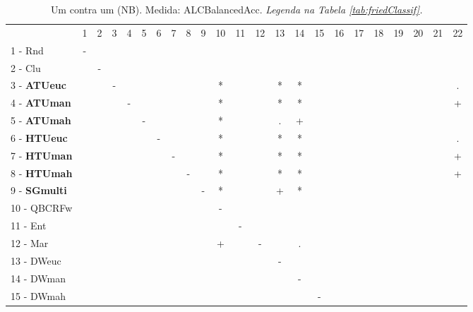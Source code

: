 \begin{table}[h]
\caption{Um contra um (NB). Medida: ALCBalancedAcc. \textit{Legenda na Tabela \ref{tab:friedClassif}.}}
\begin{center}\begin{tabular}{lcc|cc|cc|cc|cc|cc|cc|cc|cc|cc|cc}
 			& 1 & 2 & 3 & 4 & 5 & 6 & 7 & 8 & 9 & 10 & 11 & 12 & 13 & 14 & 15 & 16 & 17 & 18 & 19 & 20 & 21 & 22\\
1 - Rnd  	& - &   &   &   &   &   &   &   &   &   &   &   &   &   &   &   &   &   &   &   &   &   \\
2 - Clu  	&   & - &   &   &   &   &   &   &   &   &   &   &   &   &   &   &   &   &   &   &   &   \\ \hline
3 - \textbf{ATUeuc}	&   &   & - &   &   &   &   &   &   & * &   &   & * & * &   &   &   &   &   &   &   & . \\
4 - \textbf{ATUman}	&   &   &   & - &   &   &   &   &   & * &   &   & * & * &   &   &   &   &   &   &   & + \\ \hline
5 - \textbf{ATUmah}	&   &   &   &   & - &   &   &   &   & * &   &   & . & + &   &   &   &   &   &   &   &   \\
6 - \textbf{HTUeuc}	&   &   &   &   &   & - &   &   &   & * &   &   & * & * &   &   &   &   &   &   &   & . \\ \hline
7 - \textbf{HTUman}	&   &   &   &   &   &   & - &   &   & * &   &   & * & * &   &   &   &   &   &   &   & + \\
8 - \textbf{HTUmah}	&   &   &   &   &   &   &   & - &   & * &   &   & * & * &   &   &   &   &   &   &   & + \\ \hline
9 - \textbf{SGmulti}	&   &   &   &   &   &   &   &   & - & * &   &   & + & * &   &   &   &   &   &   &   &   \\
10 - QBCRFw	&   &   &   &   &   &   &   &   &   & - &   &   &   &   &   &   &   &   &   &   &   &   \\ \hline
11 - Ent  	&   &   &   &   &   &   &   &   &   &   & - &   &   &   &   &   &   &   &   &   &   &   \\
12 - Mar  	&   &   &   &   &   &   &   &   &   & + &   & - &   & . &   &   &   &   &   &   &   &   \\ \hline
13 - DWeuc	&   &   &   &   &   &   &   &   &   &   &   &   & - &   &   &   &   &   &   &   &   &   \\
14 - DWman	&   &   &   &   &   &   &   &   &   &   &   &   &   & - &   &   &   &   &   &   &   &   \\ \hline
15 - DWmah	&   &   &   &   &   &   &   &   &   &   &   &   &   &   & - &   &   &   &   &   &   &   \\

\end{tabular}
\end{center}
\end{table}
